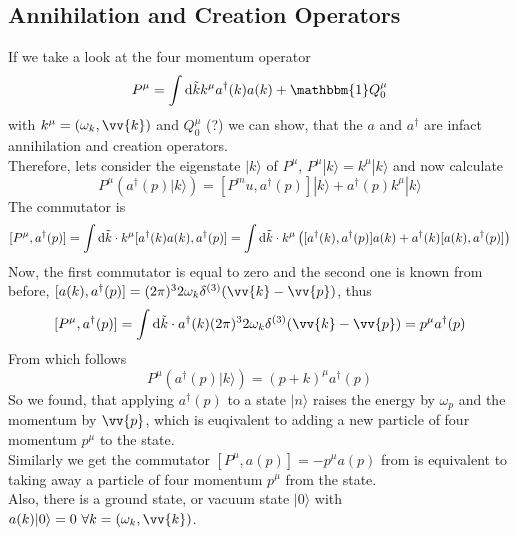 \documentclass{include/thesisclass}
\newcommand{\cc}{\cdot}
\newcommand{\rk}{\rangle}
\newcommand{\vp}{\vv{p}}
\newcommand{\dd}{{\rm d}}
\newcommand{\ehm}{\mathbbm{1}}
\begin{document}
\subsection{Annihilation and Creation Operators}
If we take a look at the four momentum operator
\[P^\mu = \int \dd \tilde{k} k^\mu a^\dagger(k) a(k) + \ehm Q_0^\mu\]
with $k^\mu = (\omega_k, \vv{k})$ and $Q_0^\mu$ (?) we can show, that the $a$ and $a^\dagger$ are infact annihilation and creation operators.\\
Therefore, lets consider the eigenstate $|k\rk$ of $P^\mu$, $P^\mu|k\rk = k^\mu|k\rk$ and now calculate
\[ P^\mu\left( a^\dagger(p) |k\rk\right) = [ P^mu, a^\dagger(p)]|k\rk + a^\dagger(p) k^\mu|k\rk\]
The commutator is
\[ [P^\mu, a^\dagger(p)] = \int \dd \tilde{k}\cc k^\mu [ a^\dagger(k)a(k), a^\dagger(p)] = \int \dd \tilde{k}\cc k^\mu \left([ a^\dagger(k), a^\dagger(p)]a(k) + a^\dagger(k) [a(k), a^\dagger(p)]\right)\]
Now, the first commutator is equal to zero and the second one is known from before, $[a(k), a^\dagger(p)] = (2\pi)^3 2 \omega_k \delta^{(3)} (\vv{k} - \vp)$, thus
\[ [P^\mu, a^\dagger(p)] = \int \dd \tilde{k}\cc a^\dagger(k)(2\pi)^3 2 \omega_k \delta^{(3)}(\vv{k}-\vp) = p^\mu a^\dagger(p)\]
From which follows
\[ P^\mu \left( a^\dagger(p) |k\rk\right) = ( p + k )^\mu a^\dagger(p)\]
So we found, that applying $a^\dagger(p)$ to a state $|n\rk$ raises the energy by $\omega_p$ and the momentum by $\vp$, which is euqivalent to adding a new particle of four momentum $p^\mu$ to the state.\\
Similarly we get the commutator $[P^\mu, a(p)] = - p^\mu a(p)$ from is equivalent to taking away a particle of four momentum $p^\mu$ from the state.\\
Also, there is a ground state, or vacuum state $|0\rk$ with $a(k) |0\rk = 0 ~\forall k = (\omega_k, \vv{k})$.
\end{document}
